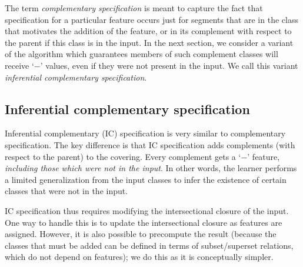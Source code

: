 \documentclass[12pt, oneside]{article}   	%
\begin{document}
The term \textit{complementary specification} is meant to capture the fact that specification for a particular feature occurs just for segments that are in the class that motivates the addition of the feature, or in its complement with respect to the parent if this class is in the input. In the next section, we consider a variant of the algorithm which guarantees members of such complement classes will receive `$-$' values, even if they were not present in the input. We call this variant \textit{inferential complementary specification}.

\FloatBarrier
\subsection{Inferential complementary specification}
\label{sec:contrastive}

Inferential complementary (IC) specification is very similar to complementary specification. The key difference is that IC specification adds complements (with respect to the parent) to the covering. Every complement gets a `$-$' feature, \textit{including those which were not in the input}. In other words, the learner performs a limited generalization from the input classes to infer the existence of certain classes that were not in the input.

IC specification thus requires modifying the intersectional closure of the input. One way to handle this is to update the intersectional closure as features are assigned. However, it is also possible to precompute the result (because the classes that must be added can be defined in terms of subset/superset relations, which do not depend on features); we do this as it is conceptually simpler.
\end{document}
